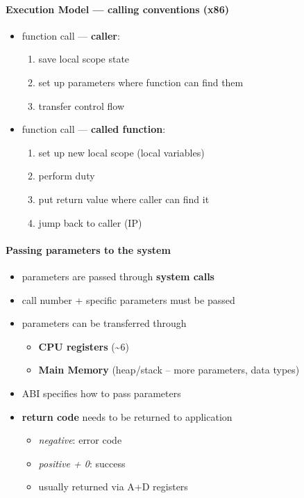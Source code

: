 \paragraph{Execution Model --- calling conventions (x86)}
\begin{itemize}
  \item function call --- \textbf{caller}:
  \begin{enumerate}
    \item save local scope state 
    \item set up parameters where function can find them
    \item transfer control flow
  \end{enumerate}
  \item function call --- \textbf{called function}:
  \begin{enumerate}
    \item set up new local scope (local variables)
    \item perform duty
    \item put return value where caller can find it
    \item jump back to caller (IP)
  \end{enumerate}
\end{itemize}

\paragraph{Passing parameters to the system}
\begin{itemize}
  \item parameters are passed through \textbf{system calls}
  \item call number + specific parameters must be passed
  \item parameters can be transferred through
  \begin{itemize}
    \item \textbf{CPU registers} (\textasciitilde 6)
    \item \textbf{Main Memory} (heap/stack -- more parameters, data types)
  \end{itemize}
  \item ABI specifies how to pass parameters
  \item \textbf{return code} needs to be returned to application
  \begin{itemize}
    \item \emph{negative}: error code
    \item \emph{positive + 0}: success
    \item usually returned via A+D registers
  \end{itemize}
\end{itemize}

